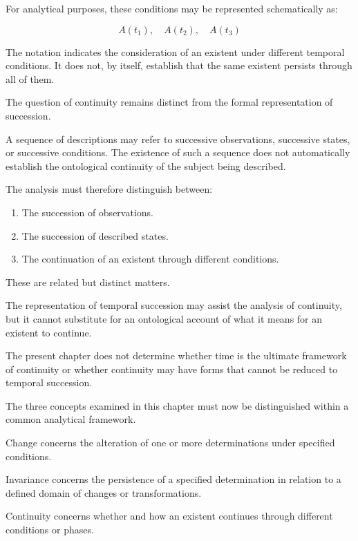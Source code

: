 For analytical purposes, these conditions
may be represented schematically as:

\[
A(t_1), \quad A(t_2), \quad A(t_3)
\]

The notation indicates the consideration
of an existent under different temporal
conditions. It does not, by itself,
establish that the same existent persists
through all of them.

The question of continuity remains distinct
from the formal representation of succession.

A sequence of descriptions may refer to
successive observations, successive states,
or successive conditions. The existence
of such a sequence does not automatically
establish the ontological continuity of
the subject being described.

The analysis must therefore distinguish
between:

\begin{enumerate}
    \item The succession of observations.
    \item The succession of described states.
    \item The continuation of an existent
    through different conditions.
\end{enumerate}

These are related but distinct matters.

The representation of temporal succession
may assist the analysis of continuity,
but it cannot substitute for an ontological
account of what it means for an existent
to continue.

The present chapter does not determine
whether time is the ultimate framework
of continuity or whether continuity
may have forms that cannot be reduced
to temporal succession.


The three concepts examined in this
chapter must now be distinguished
within a common analytical framework.

Change concerns the alteration of
one or more determinations under
specified conditions.

Invariance concerns the persistence
of a specified determination in
relation to a defined domain of
changes or transformations.

Continuity concerns whether and
how an existent continues through
different conditions or phases.

